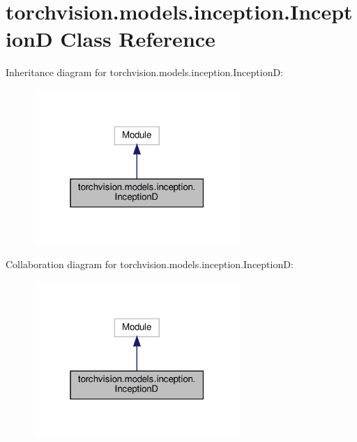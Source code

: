 \hypertarget{classtorchvision_1_1models_1_1inception_1_1InceptionD}{}\section{torchvision.\+models.\+inception.\+InceptionD Class Reference}
\label{classtorchvision_1_1models_1_1inception_1_1InceptionD}


Inheritance diagram for torchvision.\+models.\+inception.\+InceptionD\+:
\nopagebreak
\begin{figure}[H]
\begin{center}
\leavevmode
\includegraphics[width=223pt]{classtorchvision_1_1models_1_1inception_1_1InceptionD__inherit__graph}
\end{center}
\end{figure}


Collaboration diagram for torchvision.\+models.\+inception.\+InceptionD\+:
\nopagebreak
\begin{figure}[H]
\begin{center}
\leavevmode
\includegraphics[width=223pt]{classtorchvision_1_1models_1_1inception_1_1InceptionD__coll__graph}
\end{center}
\end{figure}
